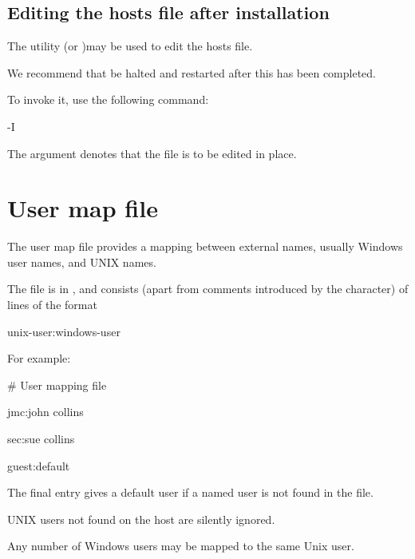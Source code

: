 \subsection{Editing the hosts file after installation}
The utility \PrHostedit{} (or \PrXhostedit)may be used to edit the hosts file.

We recommend that \ProductName{} be halted and restarted after this has been
completed.

To invoke it, use the following command:

\begin{expara}

\HosteditName{} -I \hostsfilename

\end{expara}

The argument denotes that the file is to be edited in place.

\section{User map file}
The user map file provides a mapping between external names, usually Windows user names, and UNIX names.

The file is in \usermap, and consists (apart from comments introduced by the \filename{\#} character) of
lines of the format

\begin{expara}

unix-user:windows-user

\end{expara}

For example:

\begin{expara}

\# User mapping file

jmc:john collins

sec:sue collins

guest:default

\end{expara}

The final entry gives a default user if a named user is not found in the file.

UNIX users not found on the host are silently ignored.

Any number of Windows users may be mapped to the same Unix user.

